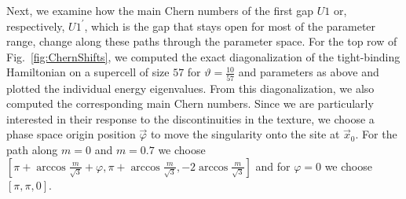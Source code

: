 \documentclass[submission, Phys]{SciPost}
\begin{document}
\figureX
Next, we examine how the main Chern numbers of the first gap $U1$ or, respectively, $U1^{\prime}$, which is the gap that stays open for most of the parameter range, change along these paths through the parameter space.
For the top row of Fig.~\ref{fig:ChernShifts}, we computed the exact diagonalization of the tight-binding Hamiltonian on a supercell of size $57$ for $\vartheta=\frac{10}{57}$ and parameters as above and plotted the individual energy eigenvalues. From this diagonalization, we also computed the corresponding main Chern numbers.
Since we are particularly interested in their response to the discontinuities in the texture, we choose a phase space origin position $\vec{\varphi}$ to move the singularity onto the site at $\vec{x}_0$.
For the path along $m=0$ and $m=0.7$ we choose $[\pi+\arccos{\frac{m}{\sqrt{3}}}+\varphi,\pi+\arccos{\frac{m}{\sqrt{3}}},-2\arccos{\frac{m}{\sqrt{3}}}]$ and for $\varphi=0$ we choose $[\pi,\pi,0]$.
\end{document}
